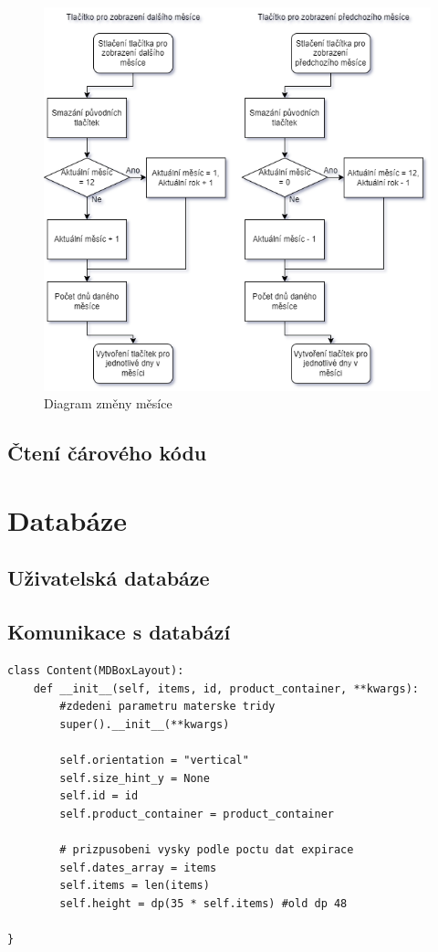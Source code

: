 \documentclass[12pt, a4paper, oneside]{report}
\begin{document}
\begin{figure}
    \centering
    \includegraphics[width=0.6\linewidth]{obrazky/change_date.png}
    \caption{Diagram změny měsíce}
    \label{fig:changeDateDiag}
\end{figure}
\clearpage

\section{Čtení čárového kódu}
\chapter{Databáze}
\section{Uživatelská databáze}
\section{Komunikace s databází}
\begin{lstlisting}[style=python]
class Content(MDBoxLayout):
    def __init__(self, items, id, product_container, **kwargs):
        #zdedeni parametru materske tridy
        super().__init__(**kwargs)

        self.orientation = "vertical"
        self.size_hint_y = None
        self.id = id
        self.product_container = product_container

        # prizpusobeni vysky podle poctu dat expirace
        self.dates_array = items
        self.items = len(items)
        self.height = dp(35 * self.items) #old dp 48

}
\end{lstlisting}
\end{document}
